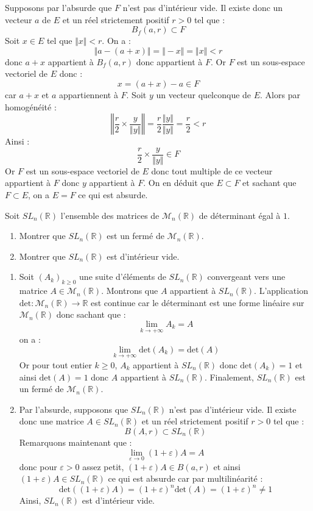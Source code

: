 \documentclass[a4paper,10pt]{report}
\begin{document}
\corr Supposons par l'absurde que $F$ n'est pas d'intérieur vide. Il existe donc un vecteur $a$ de $E$ et un réel strictement positif $r>0$ tel que :
$$ B_f(a,r) \subset F$$
Soit $x \in E$ tel que $\Vert x \Vert <r$. On a :
$$ \Vert a-(a+x) \Vert =  \Vert -x \Vert = \Vert x \Vert < r$$
donc $a+x$ appartient à $B_f(a,r)$ donc appartient à $F$. Or $F$ est un sous-espace vectoriel de $E$ donc :
$$ x = (a+x) -a \in F$$
car $a+x$ et $a$ appartiennent à $F$. Soit $y$ un vecteur quelconque de $E$. Alors par homogénéité :
$$ \left\Vert \dfrac{r}{2} \times \dfrac{y}{\Vert y \Vert } \right\Vert  = \dfrac{r}{2} \dfrac{\Vert y \Vert }{\Vert y \Vert } = \dfrac{r}{2} < r$$
Ainsi :
$$ \dfrac{r}{2} \times \dfrac{y}{\Vert y \Vert } \in F$$
Or $F$ est un sous-espace vectoriel de $E$ donc tout multiple de ce vecteur appartient à $F$ donc $y$ appartient à $F$. On en déduit que $E \subset F$ et sachant que $F \subset E$, on a $E=F$ ce qui est absurde.

\begin{Exercice}{} Soit $SL_n(\mathbb{R})$ l'ensemble des matrices de $\mathcal{M}_n(\mathbb{R})$ de déterminant égal à $1$.
\begin{enumerate}
\item Montrer que $SL_n(\mathbb{R})$ est un fermé de $\mathcal{M}_n(\mathbb{R})$.
\item Montrer que $SL_n(\mathbb{R})$ est d'intérieur vide.
\end{enumerate}
\end{Exercice}

\corr 

\begin{enumerate}
\item Soit $(A_k)_{k \geq 0}$ une suite d'éléments de $SL_n(\mathbb{R})$ convergeant vers une matrice $A \in \mathcal{M}_n(\mathbb{R})$. Montrons que $A$ appartient à $SL_n(\mathbb{R})$. L'application $\textrm{det} : \mathcal{M}_n(\mathbb{R}) \rightarrow \mathbb{R}$ est continue car le déterminant est une forme linéaire sur $\mathcal{M}_n(\mathbb{R})$ donc sachant que  :
$$ \lim_{k \rightarrow + \infty} A_k = A$$
on a :
$$ \lim_{k \rightarrow + \infty} \textrm{det}(A_k) = \textrm{det}(A)$$
Or pour tout entier $k \geq 0$, $A_k$ appartient à $SL_n(\mathbb{R})$ donc $\textrm{det}(A_k)=1$ et ainsi $\textrm{det}(A)=1$ donc $A$ appartient à $SL_n(\mathbb{R})$. Finalement, $SL_n(\mathbb{R})$ est un fermé de $\mathcal{M}_n(\mathbb{R})$.
\item Par l'absurde, supposons que $SL_n(\mathbb{R})$ n'est pas d'intérieur vide. Il existe donc une matrice $A \in SL_n(\mathbb{R})$ et un réel strictement positif $r>0$ tel que :
$$ B(A,r) \subset SL_n(\mathbb{R})$$
Remarquons maintenant que :
$$ \lim_{\varepsilon \rightarrow 0} (1+ \varepsilon) A= A$$
donc pour $\varepsilon>0$ assez petit, $(1+ \varepsilon) A \in B(a,r)$ et ainsi $(1+ \varepsilon) A \in SL_n(\mathbb{R})$ ce qui est absurde car par multilinéarité : 
$$ \textrm{det}((1+ \varepsilon)A)= (1+\varepsilon)^n \textrm{det}(A) = (1+\varepsilon)^n \neq 1$$
Ainsi, $SL_n(\mathbb{R})$ est d'intérieur vide.
\end{enumerate}
\end{document}
